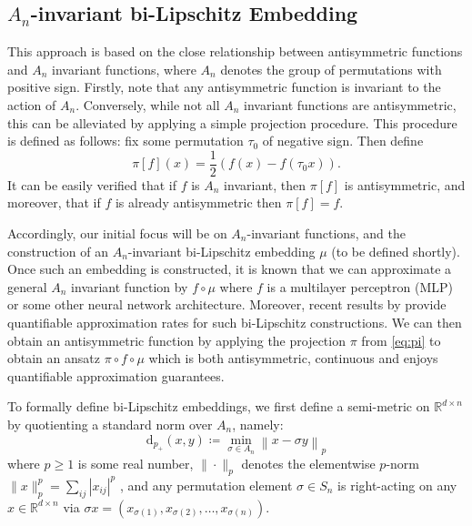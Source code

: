 \documentclass{amsart}
\theoremstyle{plain}
\theoremstyle{definition}
\theoremstyle{remark}
\newcommand{\RR}{\mathbb{R}}
\newcommand{\abs}[1]{\left\lvert#1\right\rvert}
\newcommand{\normp}[2]{\left\|#1\right\|_{#2}}
\newcommand{\dap}[1]{\mathrm{d}_{#1_+}}
\begin{document}
\subsection{$A_n$-invariant bi-Lipschitz Embedding}
This approach is based on the close relationship between antisymmetric functions and $A_n$ invariant functions, where $A_n$ denotes the group of permutations with positive sign. Firstly, note that any antisymmetric function is invariant to the action of  $A_n$. Conversely, while not all $A_n$ invariant functions are antisymmetric, this can be alleviated by applying a simple projection procedure. This procedure is defined as follows: fix some permutation $\tau_0$ of negative sign. Then define 
\begin{equation}\label{eq:pi}
	\pi[f](x) =\frac{1}{2}\left( f (x) - f(\tau_0 x) \right).
\end{equation}
It can be easily verified that if $f$ is $A_n$ invariant, then $\pi[f]$ is antisymmetric, and moreover, that if $f$ is already antisymmetric then $\pi[f]=f$. 

Accordingly, our initial focus will be on $A_n$-invariant functions, and the construction of an $A_n$-invariant bi-Lipschitz embedding $\mu$ (to be defined shortly). Once such an embedding is constructed, it is known that we can approximate a general $A_n $ invariant function by $f\circ \mu $ where $f$ is a multilayer perceptron (MLP) or some other neural network architecture. Moreover, recent results by \cite{newPaper} provide quantifiable approximation rates for such bi-Lipschitz constructions. We can then obtain an antisymmetric function by applying the projection $\pi$ from \eqref{eq:pi} to obtain an ansatz $\pi \circ f \circ \mu $ which is both antisymmetric, continuous and enjoys quantifiable approximation guarantees.

To formally define bi-Lipschitz embeddings,  we first define a semi-metric on $\RR^{d\times n}$ by quotienting a standard norm over $A_n$, namely:
\begin{equation}
	\dap{p}{\left(x,y \right)} \coloneq \min_{\sigma \in A_n}{\normp{x-\sigma y}{p}}
\end{equation}
where $p \geq 1$ is some real number, $\|\cdot\|_p$ denotes the elementwise $p$-norm $\|x\|_p^p=\sum_{ij}\abs{x_{ij}}^p $ , and any permutation element $\sigma \in S_n$ is right-acting on any $x \in \RR^{d \times n}$ via  $\sigma x = \left(x_{\sigma(1)}, x_{\sigma(2)}, \ldots, x_{\sigma(n)} \right)$.
\end{document}
